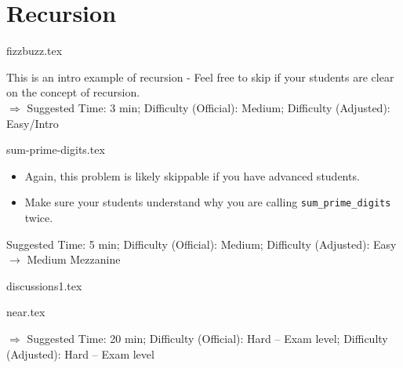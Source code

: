 \documentclass{exam}
\begin{document}
\section{Recursion}
\begin{questions}
    {fizzbuzz.tex}
    \begin{questionmeta}
        This is an intro example of recursion - Feel free to skip if your students are clear on the concept of recursion.\\
        $\Rightarrow$ Suggested Time: 3 min; Difficulty (Official): Medium; Difficulty (Adjusted): Easy/Intro
      \end{questionmeta}

    {sum-prime-digits.tex}
    \begin{questionmeta}
        \begin{itemize}
            \item Again, this problem is likely skippable if you have advanced students.
            \item Make sure your students understand why you are calling \lstinline{sum_prime_digits} twice.
        \end{itemize}    
        Suggested Time: 5 min; Difficulty (Official): Medium; Difficulty (Adjusted): Easy $\rightarrow$ Medium Mezzanine
      \end{questionmeta}
    
    {discussions1.tex} 

    {near.tex}
    \begin{questionmeta}
        $\Rightarrow$ Suggested Time: 20 min; Difficulty (Official): Hard -- Exam level; Difficulty (Adjusted): Hard -- Exam level
    \end{questionmeta}
\end{questions}
\end{document}
